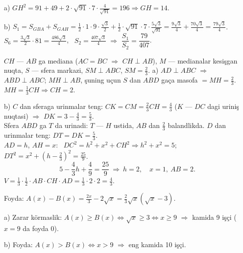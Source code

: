 a) $GH^2=91+49+2\cdot\sqrt{91}\cdot7\cdot\frac4{\sqrt{91}}=196\Rightarrow GH=14$.

b) $S_1=S_{GBA}+S_{GAH}=\frac12\cdot1\cdot9\cdot\frac{\sqrt3}2+\frac12\cdot\sqrt{91}\cdot7\cdot\frac{5\sqrt3}{\sqrt{91}}=\frac{9\sqrt3}4+\frac{70\sqrt3}4=\frac{79\sqrt3}4$.\\
$S_{6}=\frac{3\sqrt3}2\cdot81=\frac{486\sqrt3}4$, \ $S_2=\frac{407\sqrt3}4$ $\Rightarrow$ $\dfrac{S_1}{S_2}=\dfrac{79}{407}$.

\newpage
{}
$CH$ — $AB$ ga mediana ($AC=BC$ $\Rightarrow$ $CH\perp AB$), $M$ — medianalar kesişgan nuqta, $S$ — sfera markazi, $SM\perp ABC$, $SM=\frac23$.
a) $AD\perp ABC$ $\Rightarrow$ $ABD\perp ABC$; $MH\perp AB$, şuning uçun $S$ dan $ABD$ gaça masofa $=MH=\frac23$. \ $MH=\frac13CH\Rightarrow CH=2$.

b) $C$ dan sferaga urinmalar teng: $CK=CM=\frac23CH=\frac43$ ($K$ — $DC$ dagi uriniş nuqtasi) $\Rightarrow$ $DK=3-\frac43=\frac53$.\\
Sfera $ABD$ ga $T$ da urinadi: $T$ — $H$ ustida, $AB$ dan $\frac23$ balandlikda. $D$ dan urinmalar teng: $DT=DK=\frac53$.\\
$AD=h$, $AH=x$: \ $DC^2=h^2+x^2+CH^2\Rightarrow h^2+x^2=5$; \ $DT^2=x^2+\left(h-\frac23\right)^2=\frac{25}9$.
\[5-\frac43h+\frac49=\frac{25}9\ \Rightarrow\ h=2,\quad x=1,\ AB=2.\]
$V=\frac13\cdot\frac12\cdot AB\cdot CH\cdot AD=\frac13\cdot2\cdot2=\frac43$.

\newpage
{}
Foyda: $A(x)-B(x)=\frac{2x}3-2\sqrt x=\frac23\sqrt x\left(\sqrt x-3\right)$.

a) Zarar körmaslik: $A(x)\ge B(x)\iff\sqrt x\ge3\iff x\ge9$ $\Rightarrow$ kamida 9 işçi ($x=9$ da foyda 0).

b) Foyda: $A(x)>B(x)\iff x>9$ $\Rightarrow$ eng kamida 10 işçi.

\ShowJavoblar

